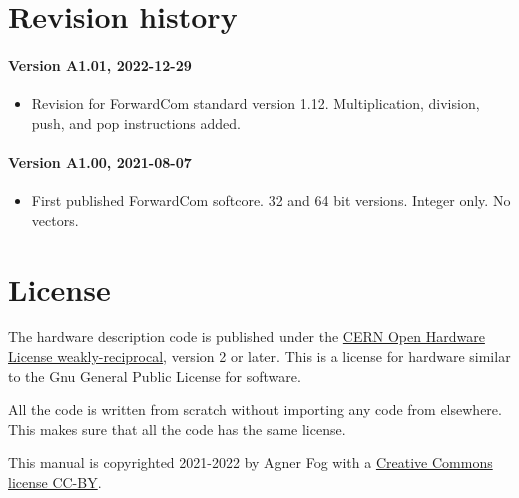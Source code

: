 \documentclass[11pt,a4paper,oneside,openright]{report}
\newcommand{\vv}{ \vspace{2mm} }   %
\begin{document}
\chapter{Revision history}

\subsubsection{Version A1.01, 2022-12-29}
\begin{itemize}
\item Revision for ForwardCom standard version 1.12. Multiplication, division, push, and pop instructions added.
\end{itemize}

\subsubsection{Version A1.00, 2021-08-07}

\begin{itemize}
\item First published ForwardCom softcore. 32 and 64 bit versions. Integer only. No vectors.
\end{itemize}
\vv


\chapter{License}
The hardware description code is published under the \href{https://cern-ohl.web.cern.ch/}{CERN Open Hardware License weakly-reciprocal}, version 2 or later. This is a license for hardware similar to the Gnu General Public License for software. 
\vv

All the code is written from scratch without importing any code from elsewhere. This makes sure that all the code has the same license.
\vv

This manual is copyrighted 2021-2022 by Agner Fog with a 
\href{https://creativecommons.org/licenses/by/4.0/legalcode}{Creative Commons license CC-BY}.
\end{document}

